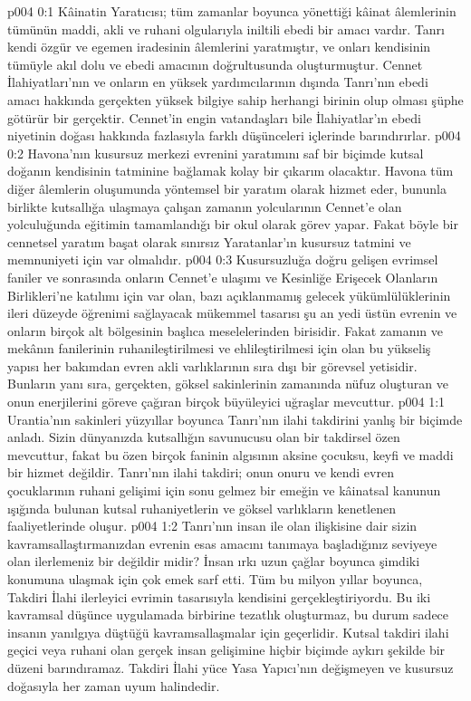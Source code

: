 \vs p004 0:1 Kâinatin Yaratıcısı; tüm zamanlar boyunca yönettiği kâinat âlemlerinin tümünün maddi, akli ve ruhani olgularıyla iniltili ebedi bir amacı vardır. Tanrı kendi özgür ve egemen iradesinin âlemlerini yaratmıştır, ve onları kendisinin tümüyle akıl dolu ve ebedi amacının doğrultusunda oluşturmuştur. Cennet İlahiyatları’nın ve onların en yüksek yardımcılarının dışında Tanrı’nın ebedi amacı hakkında gerçekten yüksek bilgiye sahip herhangi birinin olup olması şüphe götürür bir gerçektir. Cennet’in engin vatandaşları bile İlahiyatlar’ın ebedi niyetinin doğası hakkında fazlasıyla farklı düşünceleri içlerinde barındırırlar.
\vs p004 0:2 Havona’nın kusursuz merkezi evrenini yaratımını saf bir biçimde kutsal doğanın kendisinin tatminine bağlamak kolay bir çıkarım olacaktır. Havona tüm diğer âlemlerin oluşumunda yöntemsel bir yaratım olarak hizmet eder, bununla birlikte kutsallığa ulaşmaya çalışan zamanın yolcularının Cennet’e olan yolculuğunda eğitimin tamamlandığı bir okul olarak görev yapar. Fakat böyle bir cennetsel yaratım başat olarak sınırsız Yaratanlar’ın kusursuz tatmini ve memnuniyeti için var olmalıdır.
\vs p004 0:3 Kusursuzluğa doğru gelişen evrimsel faniler ve sonrasında onların Cennet’e ulaşımı ve Kesinliğe Erişecek Olanların Birlikleri’ne katılımı için var olan, bazı açıklanmamış gelecek yükümlülüklerinin ileri düzeyde öğrenimi sağlayacak mükemmel tasarısı şu an yedi üstün evrenin ve onların birçok alt bölgesinin başlıca meselelerinden birisidir. Fakat zamanın ve mekânın fanilerinin ruhanileştirilmesi ve ehlileştirilmesi için olan bu yükseliş yapısı her bakımdan evren akli varlıklarının sıra dışı bir görevsel yetisidir. Bunların yanı sıra, gerçekten, göksel sakinlerinin zamanında nüfuz oluşturan ve onun enerjilerini göreve çağıran birçok büyüleyici uğraşlar mevcuttur.
\vs p004 1:1 Urantia’nın sakinleri yüzyıllar boyunca Tanrı’nın ilahi takdirini yanlış bir biçimde anladı. Sizin dünyanızda kutsallığın savunucusu olan bir takdirsel özen mevcuttur, fakat bu özen birçok faninin algısının aksine çocuksu, keyfi ve maddi bir hizmet değildir. Tanrı’nın ilahi takdiri; onun onuru ve kendi evren çocuklarının ruhani gelişimi için sonu gelmez bir emeğin ve kâinatsal kanunun ışığında bulunan kutsal ruhaniyetlerin ve göksel varlıkların kenetlenen faaliyetlerinde oluşur.
\vs p004 1:2 Tanrı’nın insan ile olan ilişkisine dair sizin kavramsallaştırmanızdan evrenin esas amacını tanımaya başladığınız seviyeye olan ilerlemeniz bir  değildir midir? İnsan ırkı uzun çağlar boyunca şimdiki konumuna ulaşmak için çok emek sarf etti. Tüm bu milyon yıllar boyunca, Takdiri İlahi ilerleyici evrimin tasarısıyla kendisini gerçekleştiriyordu. Bu iki kavramsal düşünce uygulamada birbirine tezatlık oluşturmaz, bu durum sadece insanın yanılgıya düştüğü kavramsallaşmalar için geçerlidir. Kutsal takdiri ilahi geçici veya ruhani olan gerçek insan gelişimine hiçbir biçimde aykırı şekilde bir düzeni barındıramaz. Takdiri İlahi yüce Yasa Yapıcı’nın değişmeyen ve kusursuz doğasıyla her zaman uyum halindedir.
